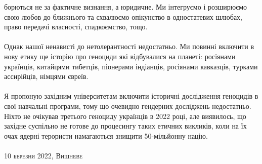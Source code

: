 борються не за фактичне визнання, а юридичне. Ми інтегруємо і розширюємо свою
любов до ближнього та схвалюємо опікунство в одностатевих шлюбах, право
передачі власності, спадкоємство, тощо.
\\
\\
Однак нашої ненависті до нетолерантності недостатньо. Ми повинні включити в
нову етику ще історію про геноциди які відбувалися на планеті: росіянами
українців, китайцями тибетців, піонерами індіанців, росіянами кавказців,
турками ассирійців, німцями євреїв.
\\
\\
Я пропоную західним університетам включити історичні дослідження геноцидів
в свої навчальні програми, тому що очевидно гендерних досліджень недостатньо.
Ніхто не очікував третього геноциду українців в 2022 році, але виявилось, що
західне суспільно не готове до процесингу таких етичних викликів, коли на їх
очах ядерні терористи намагаються знищити 50-мільйонну націю.
\\
\\
\textsc{\footnotesize 10 березня 2022, Вишневе}

\normalsize
